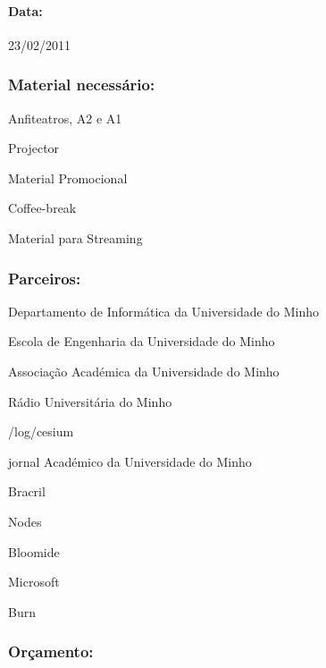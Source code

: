 \paragraph{Data:} 23/02/2011

\subsubsection*{Material necessário:}
\begin{itemizedash}
	\item{Anfiteatros, A2 e A1}
	\item{Projector}
	\item{Material Promocional}
	\item{Coffee-break}
	\item{Material para Streaming}
\end{itemizedash}

\subsubsection*{Parceiros:}
\begin{itemizedash}
	\item{Departamento de Informática da Universidade do Minho}
	\item{Escola de Engenharia da Universidade do Minho}
	\item{Associação Académica da Universidade do Minho}
	\item{Rádio Universitária do Minho}
	\item{/log/cesium}
	\item{jornal Académico da Universidade do Minho}
	\item{Bracril}
	\item{Nodes}
	\item{Bloomide}
	\item{Microsoft}
	\item{Burn}
\end{itemizedash}

\subsubsection*{Orçamento:}

